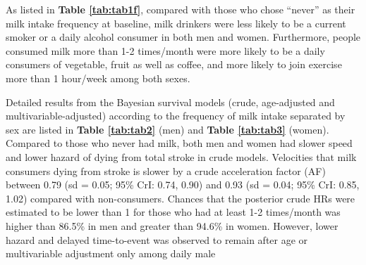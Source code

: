 \documentclass[nutrients,article,submitted,moreauthors,pdftex]{mdpi}
\begin{document}
As listed in \textbf{Table \ref{tab:tab1f}}, compared with those who
chose ``never'' as their milk intake frequency at baseline, milk
drinkers were less likely to be a current smoker or a daily alcohol
consumer in both men and women. Furthermore, people consumed milk more
than 1-2 times/month were more likely to be a daily consumers of
vegetable, fruit as well as coffee, and more likely to join exercise
more than 1 hour/week among both sexes.

Detailed results from the Bayesian survival models (crude, age-adjusted
and multivariable-adjusted) according to the frequency of milk intake
separated by sex are listed in \textbf{Table \ref{tab:tab2}} (men) and
\textbf{Table \ref{tab:tab3}} (women). Compared to those who never had
milk, both men and women had slower speed and lower hazard of dying from
total stroke in crude models. Velocities that milk consumers dying from
stroke is slower by a crude acceleration factor (AF) between 0.79 (sd =
0.05; 95\% CrI: 0.74, 0.90) and 0.93 (sd = 0.04; 95\% CrI: 0.85, 1.02)
compared with non-consumers. Chances that the posterior crude HRs were
estimated to be lower than 1 for those who had at least 1-2 times/month
was higher than 86.5\% in men and greater than 94.6\% in women. However,
lower hazard and delayed time-to-event was observed to remain after age
or multivariable adjustment only among daily male
\end{document}
